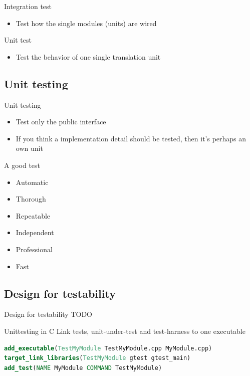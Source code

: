 \documentclass{beamer}
\begin{document}
\begin{frame}{Integration test}
\begin{itemize}
  \item Test how the single modules (units) are wired
\end{itemize}
\end{frame}

\begin{frame}{Unit test}
\begin{itemize}
  \item Test the behavior of one single translation unit
\end{itemize}
\end{frame}

\subsection{Unit testing}
\begin{frame}{Unit testing}
\begin{itemize}
  \item Test only the public interface
  \item If you think a implementation detail should be tested, then it's perhaps
  an own unit
\end{itemize}
\end{frame}

\begin{frame}{A good test}
\begin{itemize}
  \item Automatic
  \item Thorough
  \item Repeatable
  \item Independent
  \item Professional
  \item Fast
\end{itemize}
\end{frame}

\subsection{Design for testability}
\begin{frame}{Design for testability}
TODO
\end{frame}

\begin{frame}[fragile]{Unittesting in C}
Link tests, unit-under-test and test-harness to one executable
\begin{lstlisting}[language=cmake,caption=a unit test in cmake]
add_executable(TestMyModule TestMyModule.cpp MyModule.cpp)
target_link_libraries(TestMyModule gtest gtest_main)
add_test(NAME MyModule COMMAND TestMyModule)
\end{lstlisting}
\end{frame}
\end{document}

